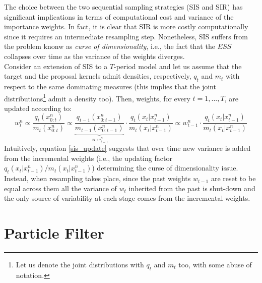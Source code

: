 \documentclass[
]{book}
\theoremstyle{break}
\theoremstyle{nonumberplain}
\begin{document}
The choice between the two sequential sampling strategies (SIS and SIR)
has significant implications in terms of computational cost and variance
of the importance weights. In fact, it is clear that SIR is more costly
computationally since it requires an intermediate resampling step.
Nonetheless, SIS suffers from the problem knonw as
\textit{curse of dimensionality}, i.e., the fact that the \(ESS\)
collapses over time as the variance of the weights diverges.\\
Consider an extension of SIS to a \(T\)-period model and let us assume
that the target and the proposal kernels admit densities, respectively,
\(q_t\) and \(m_t\) with respect to the same dominating measures (this
implies that the joint
distributions\footnote{Let us denote the joint distributions with $q_t$ and $m_t$ too, with some abuse of notation.}
admit a density too). Then, weights, for every \(t=1,...,T\), are
updated according to: \begin{equation}
    w_t^n\propto \frac{q_t(x_{0:t}^n)}{m_t(x_{0:t}^n)}\propto \underbrace{\frac{q_{t-1}( x_{0:t-1}^n)}{m_{t-1}(x_{0:t-1}^n)}}_{\propto w_{t-1}^n}\cdot \frac{q_t( x_t|x_{t-1}^n)}{m_t(x_t|x_{t-1}^n)}\propto 
    w_{t-1}^n\cdot\frac{q_t( x_t|x_{t-1}^n)}{m_t(x_t|x_{t-1}^n)}\label{sis_update}
\end{equation} Intuitively, equation \eqref{sis_update} suggests that
over time new variance is added from the incremental weights (i.e., the
updating factor \(q_t( x_t|x_{t-1}^n)/m_t( x_t|x_{t-1}^n)\)) determining
the curse of dimensionality issue. Instead, when resampling takes place,
since the past weights \(w_{t-1}\) are reset to be equal across them all
the variance of \(w_t\) inherited from the past is shut-down and the
only source of variability at each stage comes from the incremental
weights.

\section{Particle Filter}\label{pf_main}
\end{document}
